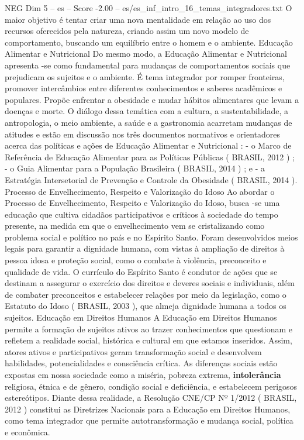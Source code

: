 \begin{textsample}{NEG Dim 5 – es – Score -2.00 – es/es\_inf\_intro\_16\_temas\_integradores.txt}
O maior objetivo é tentar criar uma nova mentalidade em relação ao uso dos recursos oferecidos pela natureza, criando assim um novo modelo de comportamento, buscando um equilíbrio entre o homem e o ambiente.
Educação Alimentar e Nutricional Do mesmo modo, a Educação Alimentar e Nutricional apresenta -se como fundamental para mudanças de comportamentos sociais que prejudicam os sujeitos e o ambiente.
É tema integrador por romper fronteiras, promover intercâmbios entre diferentes conhecimentos e saberes acadêmicos e populares.
Propõe enfrentar a obesidade e mudar hábitos alimentares que levam a doenças e morte.
O diálogo dessa temática com a cultura, a sustentabilidade, a antropologia, o meio ambiente, a saúde e a gastronomia acarretam mudanças de atitudes e estão em discussão nos três documentos normativos e orientadores acerca das políticas e ações de Educação Alimentar e Nutricional : - o Marco de Referência de Educação Alimentar para as Políticas Públicas ( BRASIL, 2012 ) ; - o Guia Alimentar para a População Brasileira ( BRASIL, 2014 ) ; e - a Estratégia Intersetorial de Prevenção e Controle da Obesidade ( BRASIL, 2014 ).
Processo de Envelhecimento, Respeito e Valorização do Idoso Ao abordar o Processo de Envelhecimento, Respeito e Valorização do Idoso, busca -se uma educação que cultiva cidadãos participativos e críticos à sociedade do tempo presente, na medida em que o envelhecimento vem se cristalizando como problema social e político no país e no Espírito Santo.
Foram desenvolvidos meios legais para garantir a dignidade humana, com vistas à ampliação de direitos à pessoa idosa e proteção social, como o combate à violência, preconceito e qualidade de vida.
O currículo do Espírito Santo é condutor de ações que se destinam a assegurar o exercício dos direitos e deveres sociais e individuais, além de combater preconceitos e estabelecer relações por meio da legislação, como o Estatuto do Idoso ( BRASIL, 2003 ), que almeja dignidade humana a todos os sujeitos.
Educação em Direitos Humanos A Educação em Direitos Humanos permite a formação de sujeitos ativos ao trazer conhecimentos que questionam e refletem a realidade social, histórica e cultural em que estamos inseridos.
Assim, atores ativos e participativos geram transformação social e desenvolvem habilidades, potencialidades e consciência crítica.
As diferenças sociais estão expostas em nossa sociedade como a miséria, pobreza extrema, \textbf{intolerância} religiosa, étnica e de gênero, condição social e deficiência, e estabelecem perigosos estereótipos.
Diante dessa realidade, a Resolução CNE/CP Nº 1/2012 ( BRASIL, 2012 ) constitui as Diretrizes Nacionais para a Educação em Direitos Humanos, como tema integrador que permite autotransformação e mudança social, política e econômica.

\end{textsample}
